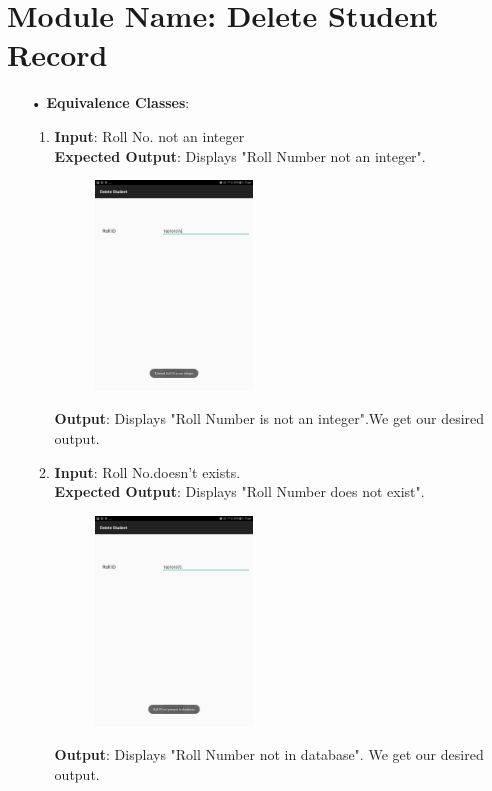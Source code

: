 \documentclass{scrreprt}
\begin{document}
\section{Module Name: Delete Student Record}
\begin{itemize}
\item[•]\textbf{Equivalence Classes}:
\begin{enumerate}
\item \textbf{Input}: Roll No. not an integer\\
\textbf{Expected Output}: Displays "Roll Number not an integer".
\begin{figure}[H]
\centering
\includegraphics[width=0.42\textwidth, keepaspectratio]{deleteinvalid.jpg}
\end{figure}
\textbf{Output}: Displays "Roll Number is not an integer".We get our desired output.

\item \textbf{Input}: Roll No.doesn't exists.\\
\textbf{Expected Output}: Displays "Roll Number does not exist". 
\begin{figure}[H]
\centering
\includegraphics[width=0.42\textwidth, keepaspectratio]{deletenot.jpg}
\end{figure}
\textbf{Output}: Displays "Roll Number not in database". We get our desired output.


\end{enumerate}
\end{itemize}
\end{document}
